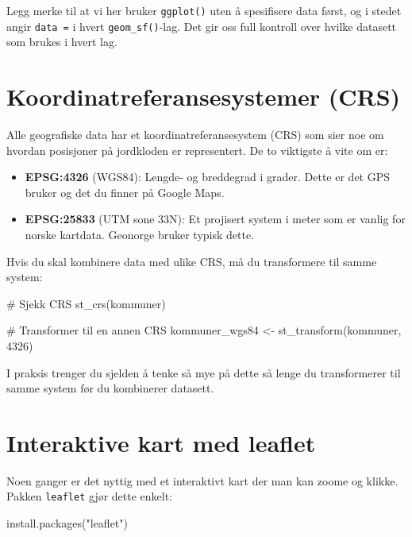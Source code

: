 \documentclass[
  norsk,
  letterpaper,
  DIV=11,
  numbers=noendperiod]{scrreprt}
\newenvironment{Shaded}{\begin{snugshade}}{\end{snugshade}}
\newcommand{\CommentTok}[1]{\textcolor[rgb]{0.37,0.37,0.37}{#1}}
\newcommand{\DecValTok}[1]{\textcolor[rgb]{0.68,0.00,0.00}{#1}}
\newcommand{\FunctionTok}[1]{\textcolor[rgb]{0.28,0.35,0.67}{#1}}
\newcommand{\NormalTok}[1]{\textcolor[rgb]{0.00,0.23,0.31}{#1}}
\newcommand{\OtherTok}[1]{\textcolor[rgb]{0.00,0.23,0.31}{#1}}
\newcommand{\StringTok}[1]{\textcolor[rgb]{0.13,0.47,0.30}{#1}}
\providecommand{\tightlist}{%
  \setlength{\itemsep}{0pt}\setlength{\parskip}{0pt}}
\theoremstyle{definition}
\theoremstyle{remark}
\begin{document}
Legg merke til at vi her bruker \texttt{ggplot()} uten å spesifisere
data først, og i stedet angir \texttt{data\ =} i hvert
\texttt{geom\_sf()}-lag. Det gir oss full kontroll over hvilke datasett
som brukes i hvert lag.

\section{Koordinatreferansesystemer
(CRS)}\label{koordinatreferansesystemer-crs}

Alle geografiske data har et koordinatreferansesystem (CRS) som sier noe
om hvordan posisjoner på jordkloden er representert. De to viktigste å
vite om er:

\begin{itemize}
\tightlist
\item
  \textbf{EPSG:4326} (WGS84): Lengde- og breddegrad i grader. Dette er
  det GPS bruker og det du finner på Google Maps.
\item
  \textbf{EPSG:25833} (UTM sone 33N): Et projisert system i meter som er
  vanlig for norske kartdata. Geonorge bruker typisk dette.
\end{itemize}

Hvis du skal kombinere data med ulike CRS, må du transformere til samme
system:

\begin{Shaded}
\begin{Highlighting}[]
\CommentTok{\# Sjekk CRS}
\FunctionTok{st\_crs}\NormalTok{(kommuner)}

\CommentTok{\# Transformer til en annen CRS}
\NormalTok{kommuner\_wgs84 }\OtherTok{\textless{}{-}} \FunctionTok{st\_transform}\NormalTok{(kommuner, }\DecValTok{4326}\NormalTok{)}
\end{Highlighting}
\end{Shaded}

I praksis trenger du sjelden å tenke så mye på dette så lenge du
transformerer til samme system før du kombinerer datasett.

\section{Interaktive kart med
leaflet}\label{interaktive-kart-med-leaflet}

Noen ganger er det nyttig med et interaktivt kart der man kan zoome og
klikke. Pakken \texttt{leaflet} gjør dette enkelt:

\begin{Shaded}
\begin{Highlighting}[]
\FunctionTok{install.packages}\NormalTok{(}\StringTok{"leaflet"}\NormalTok{)}
\end{Highlighting}
\end{Shaded}
\end{document}
